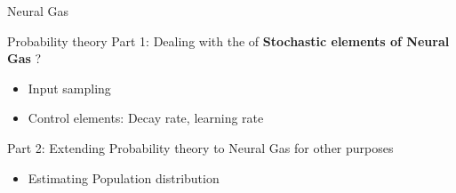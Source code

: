 \documentclass[11pt, aspectratio=169]{beamer}
\begin{document}
\begin{frame}{Neural Gas}

    
\end{frame}

\begin{frame}{Probability theory}
    Part 1: Dealing with the of \textbf{Stochastic elements of Neural Gas} ?
    \begin{itemize}
        \item Input sampling
        \item Control elements: Decay rate, learning rate
    \end{itemize}

    Part 2: Extending Probability theory to Neural Gas for other purposes
    \begin{itemize}
        \item Estimating Population distribution
    \end{itemize}

\end{frame}
\end{document}
